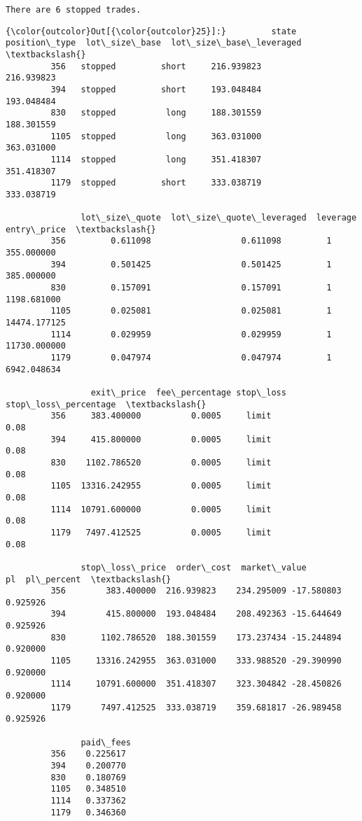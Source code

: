 \documentclass[11pt]{article}
\begin{document}
    \begin{Verbatim}[commandchars=\\\{\}]
There are 6 stopped trades.

    \end{Verbatim}

\begin{Verbatim}[commandchars=\\\{\}]
{\color{outcolor}Out[{\color{outcolor}25}]:}         state position\_type  lot\_size\_base  lot\_size\_base\_leveraged  \textbackslash{}
         356   stopped         short     216.939823               216.939823   
         394   stopped         short     193.048484               193.048484   
         830   stopped          long     188.301559               188.301559   
         1105  stopped          long     363.031000               363.031000   
         1114  stopped          long     351.418307               351.418307   
         1179  stopped         short     333.038719               333.038719   
         
               lot\_size\_quote  lot\_size\_quote\_leveraged  leverage   entry\_price  \textbackslash{}
         356         0.611098                  0.611098         1    355.000000   
         394         0.501425                  0.501425         1    385.000000   
         830         0.157091                  0.157091         1   1198.681000   
         1105        0.025081                  0.025081         1  14474.177125   
         1114        0.029959                  0.029959         1  11730.000000   
         1179        0.047974                  0.047974         1   6942.048634   
         
                 exit\_price  fee\_percentage stop\_loss  stop\_loss\_percentage  \textbackslash{}
         356     383.400000          0.0005     limit                  0.08   
         394     415.800000          0.0005     limit                  0.08   
         830    1102.786520          0.0005     limit                  0.08   
         1105  13316.242955          0.0005     limit                  0.08   
         1114  10791.600000          0.0005     limit                  0.08   
         1179   7497.412525          0.0005     limit                  0.08   
         
               stop\_loss\_price  order\_cost  market\_value         pl  pl\_percent  \textbackslash{}
         356        383.400000  216.939823    234.295009 -17.580803    0.925926   
         394        415.800000  193.048484    208.492363 -15.644649    0.925926   
         830       1102.786520  188.301559    173.237434 -15.244894    0.920000   
         1105     13316.242955  363.031000    333.988520 -29.390990    0.920000   
         1114     10791.600000  351.418307    323.304842 -28.450826    0.920000   
         1179      7497.412525  333.038719    359.681817 -26.989458    0.925926   
         
               paid\_fees  
         356    0.225617  
         394    0.200770  
         830    0.180769  
         1105   0.348510  
         1114   0.337362  
         1179   0.346360  
\end{Verbatim}
            
\end{document}
